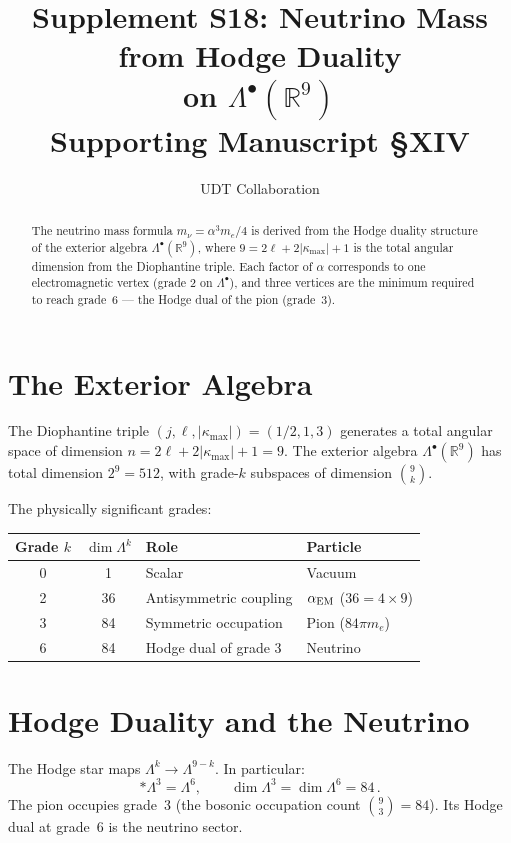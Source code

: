 \documentclass[11pt,letterpaper]{article}
\title{Supplement S18: Neutrino Mass from Hodge Duality \\
on $\Lambda^{\bullet}(\mathbb{R}^{9})$ \\
\large Supporting Manuscript \S XIV}
\author{UDT Collaboration}
\date{}
\numberwithin{equation}{section}
\begin{document}
\maketitle

\begin{abstract}
The neutrino mass formula $m_\nu = \alpha^3 m_e/4$ is derived from
the Hodge duality structure of the exterior algebra
$\Lambda^\bullet(\mathbb{R}^9)$, where $9 = 2\ell + 2|\kappa_{\max}|
+ 1$ is the total angular dimension from the Diophantine triple.
Each factor of $\alpha$ corresponds to one electromagnetic vertex
(grade 2 on $\Lambda^\bullet$), and three vertices are the minimum
required to reach grade~6 --- the Hodge dual of the pion (grade~3).
\end{abstract}

\section{The Exterior Algebra}

The Diophantine triple $(j, \ell, |\kappa_{\max}|) = (1/2, 1, 3)$
generates a total angular space of dimension
$n = 2\ell + 2|\kappa_{\max}| + 1 = 9$.  The exterior algebra
$\Lambda^\bullet(\mathbb{R}^9)$ has total dimension $2^9 = 512$, with
grade-$k$ subspaces of dimension $\binom{9}{k}$.

The physically significant grades:
\begin{center}
\begin{tabular}{ccll}
\toprule
Grade $k$ & $\dim\Lambda^k$ & Role & Particle \\
\midrule
0 & 1 & Scalar & Vacuum \\
2 & 36 & Antisymmetric coupling & $\alpha_{\rm EM}$ ($36 = 4 \times 9$) \\
3 & 84 & Symmetric occupation & Pion ($84\pi m_e$) \\
6 & 84 & Hodge dual of grade 3 & Neutrino \\
\bottomrule
\end{tabular}
\end{center}

\section{Hodge Duality and the Neutrino}

The Hodge star maps $\Lambda^k \to \Lambda^{9-k}$.  In particular:
\begin{equation}
  *\Lambda^3 = \Lambda^6, \qquad \dim\Lambda^3 = \dim\Lambda^6 = 84\,.
\end{equation}
The pion occupies grade~3 (the bosonic occupation count
$\binom{9}{3} = 84$).  Its Hodge dual at grade~6 is the neutrino
sector.
\end{document}
